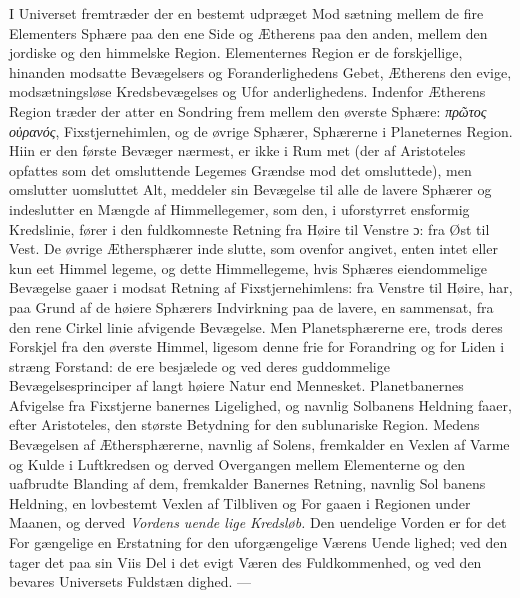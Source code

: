 \documentclass[12pt,a4paper]{book}
\newcommand{\gk}[1]{\textit{#1}}
\begin{document}
I Universet fremtræder der en bestemt udpræget Mod\-%
sætning mellem de fire Elementers Sphære paa den ene Side
og Ætherens paa den anden, mellem den jordiske og den
himmelske Region. Elementernes Region er de forskjellige,
hinanden modsatte Bevægelsers og Foranderlighedens Gebet,
Ætherens den evige, modsætningsløse Kredsbevægelses og Ufor\-%
anderlighedens. Indenfor Ætherens Region træder der atter en
Sondring frem mellem den øverste Sphære: \gk{πρῶτος οὐρανός},
Fixstjernehimlen, og de øvrige Sphærer, Sphærerne i Planeternes
Region. Hiin er den første Bevæger nærmest, er ikke i Rum\-%
met (der af Aristoteles opfattes som det omsluttende Legemes
Grændse mod det omsluttede), men omslutter uomsluttet Alt,
meddeler sin Bevægelse til alle de lavere Sphærer og indeslutter
en Mængde af Himmellegemer, som den, i uforstyrret ensformig
Kredslinie, fører i den fuldkomneste Retning fra Høire til
Venstre ɔ: fra Øst til Vest. De øvrige Æthersphærer inde\-%
slutte, som ovenfor angivet, enten intet eller kun eet Himmel\-%
legeme, og dette Himmellegeme, hvis Sphæres eiendommelige
Bevægelse gaaer i modsat Retning af Fixstjernehimlens: fra
Venstre til Høire, har, paa Grund af de høiere Sphærers
Indvirkning paa de lavere, en sammensat, fra den rene Cirkel\-%
linie afvigende Bevægelse. Men Planetsphærerne ere, trods
deres Forskjel fra den øverste Himmel, ligesom denne frie for
Forandring og for Liden i stræng Forstand: de ere besjælede
og ved deres guddommelige Bevægelsesprinciper af langt høiere
Natur end Mennesket. Planetbanernes Afvigelse fra Fixstjerne\-%
banernes Ligelighed, og navnlig Solbanens Heldning faaer, efter
Aristoteles, den største Betydning for den sublunariske Region.
Medens Bevægelsen af Æthersphærerne, navnlig af Solens,
fremkalder en Vexlen af Varme og Kulde i Luftkredsen og
derved Overgangen mellem Elementerne og den uafbrudte
Blanding af dem, fremkalder Banernes Retning, navnlig Sol\-%
banens Heldning, en lovbestemt Vexlen af Tilbliven og For\-%
gaaen i Regionen under Maanen, og derved \emph{Vordens uende\-%
lige Kredsløb.} Den uendelige Vorden er for det For\-%
gængelige en Erstatning for den uforgængelige Værens Uende\-%
lighed; ved den tager det paa sin Viis Del i det evigt Væren\-%
des Fuldkommenhed, og ved den bevares Universets Fuldstæn\-%
dighed. ---
\end{document}
